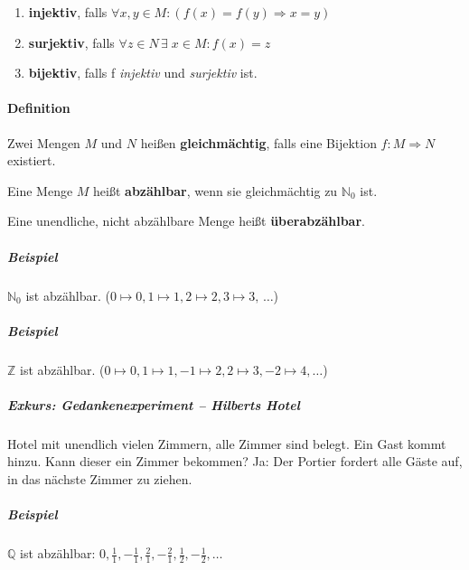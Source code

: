 \documentclass[14pt,a4paper]{article}
\newcommand{\N}{\ensuremath{\mathbb{N}}}
\newcommand{\Z}{\ensuremath{\mathbb{Z}}}
\newcommand{\Nzero}{\ensuremath{\N_0}}
\begin{document}
  \begin{enumerate}
  \item \textbf{injektiv}, falls $ \forall x,y \in M : (f(x) = f(y) \Rightarrow
    x = y) $
  \item \textbf{surjektiv}, falls $ \forall z \in N \,\exists\; x \in M : f(x) =
    z $
    \item \textbf{bijektiv}, falls f \textit{injektiv} und \textit{surjektiv} ist.
  \end{enumerate}

  \paragraph{Definition}
  Zwei Mengen $M$ und $N$ heißen \textbf{gleichmächtig}, falls eine Bijektion
  $ f : M \Rightarrow N $ existiert.

  Eine Menge $M$ heißt \textbf{abzählbar}, wenn sie gleichmächtig zu $ \Nzero $
  ist.

  Eine unendliche, nicht abzählbare Menge heißt \textbf{überabzählbar}.

  \subparagraph{Beispiel}
  $ \Nzero $ ist abzählbar. ($ 0 \mapsto 0, 1 \mapsto 1, 2 \mapsto 2, 3 \mapsto
  3,\,\ldots$)

  \subparagraph{Beispiel}
  $ \Z $ ist abzählbar. ($ 0 \mapsto 0, 1 \mapsto 1, -1 \mapsto 2, 2 \mapsto 3,
  -2 \mapsto 4, \ldots$)

  \subparagraph{Exkurs: Gedankenexperiment – Hilberts Hotel}
  Hotel mit unendlich vielen Zimmern, alle Zimmer sind belegt.
  Ein Gast kommt hinzu. Kann dieser ein Zimmer bekommen?
  Ja: Der Portier fordert alle Gäste auf, in das nächste Zimmer zu ziehen.

  \subparagraph{Beispiel}
  $ \mathbb{Q}$ ist abzählbar: $0, \frac{1}{1}, - \frac{1}{1}, \frac{2}{1},
  -\frac{2}{1}, \frac{1}{2}, -\frac{1}{2}, \ldots$
\end{document}
